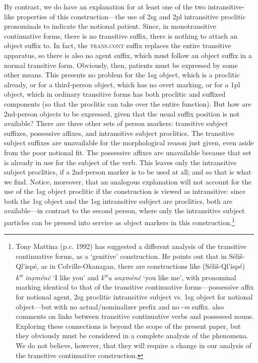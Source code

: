 \documentclass[output=paper,colorlinks,citecolor=brown]{langscibook}
\begin{document}
By contrast, we do have an explanation for at least one of the two
intransitive-like properties of this construction---the use of 2sg and
2pl intransitive proclitic pronominals to indicate the notional
patient.  Since, in monotransitive continuative forms, there is no
transitive suffix, there is nothing to attach an object suffix to.  In
fact, the \textsc{trans.cont} suffix replaces the entire transitive
apparatus, so there is also no agent suffix, which must follow an
object suffix in a normal transitive form.  Obviously, then, patients
must be expressed by some other means.  This presents no problem for
the 1sg object, which is a proclitic already, or for a third-person
object, which has no overt marking, or for a 1pl object, which in
ordinary transitive forms has both proclitic and suffixed components
(so that the proclitic can take over the entire function).  But how
are 2nd-person objects to be expressed, given that the usual suffix
position is not available?  There are three other sets of person
markers: transitive subject suffixes, possessive affixes, and
intransitive subject proclitics.  The transitive subject suffixes are
unavailable for the morphological reason just given, even aside from
the poor notional fit.  The possessive affixes are unavailable because
that set is already in use for the subject of the verb.  This leaves
only the intransitive subject proclitics, if a 2nd-person marker is to
be used at all; and so that is what we find.  Notice, moreover, that
an analogous explanation will not account for the use of the 1sg
object proclitic if the construction is viewed as intransitive: since
both the 1sg object and the 1sg intransitive subject are proclitics,
both are available---in contrast to the second person, where only the
intransitive subject particles can be pressed into service as object
markers in this construction.\footnote{Tony Mattina (p.c. 1992) has
suggested a different analysis of the transitive continuative forms,
as a `genitive' construction.  He points out that in
S\'eli\v{s}-Ql'isp\'e, as in Colville-Okanagan, there are
constructions like (S\'eli\v{s}-Ql'isp\'e) \emph{{k\textsuperscript w}
in\d{x}m\'en\v{c}} `I like you' and \emph{{k\textsuperscript w}u
an\d{x}m\'en\v{c}} `you like me', with pronominal marking identical to
that of the transitive continuative forms---possessive affix for
notional agent, 2sg proclitic intransitive subject vs. 1sg object for
notional object---but with no actual/nominalizer prefix and no
-\emph{m} suffix.  \cite[32]{Vogt:1940} also comments on links
between transitive continuative verbs and possessed nouns.  Exploring
these connections is beyond the scope of the present paper, but they
obviously must be considered in a complete analysis of the phenomena.
We do not believe, however, that they will require a change in our
analysis of the transitive continuative construction.  }
\end{document}
